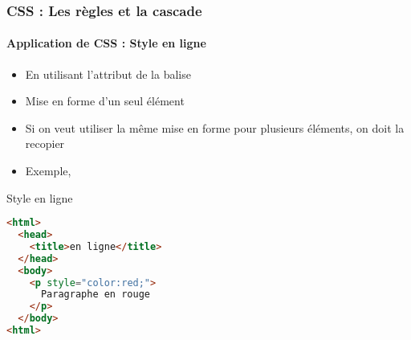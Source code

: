 \documentclass[xcolor=table]{beamer}
\begin{document}
\begin{frame}[fragile]
\frametitle{CSS : Les règles et la cascade}
\framesubtitle{Application de CSS : Style en ligne}

\begin{minipage}{0.60\textwidth} 
	\begin{itemize}
		\item En utilisant l'attribut  de la balise
		\item Mise en forme d'un seul élément
		\item Si on veut utiliser la même mise en forme pour plusieurs éléments, on doit la recopier
		\item Exemple, 
	\end{itemize}
\end{minipage}
%
\begin{minipage}{0.38\textwidth}
\begin{block}{Style en ligne}
\lstset{escapeinside=**}
\scriptsize\bfseries
\begin{lstlisting}[language={html}]
<html>
  <head>
    <title>en ligne</title>
  </head>
  <body>
    <p style="color:red;">
      Paragraphe en rouge
    </p>
  </body>
<html>
\end{lstlisting}
\end{block}
\end{minipage}
\end{frame}
\end{document}
